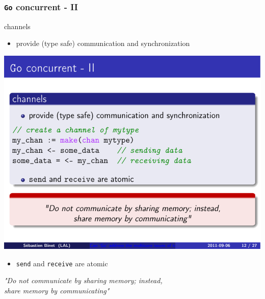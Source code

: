 \documentclass[9pt]{beamer}
\begin{document}
\begin{frame}[fragile]
\frametitle{\verb~Go~ concurrent - II}
\begin{block}{channels}


\begin{itemize}
\item provide (type safe) communication and synchronization
\end{itemize}

\begin{center}
  \includegraphics[width=.5\linewidth]{figs/go-chan.pdf}
\end{center}





\begin{itemize}
\item \verb~send~ and \verb~receive~ are atomic
\end{itemize}
\end{block}

\begin{alertblock}{\quad}

 \begin{center}
 \emph{
 "Do not communicate by sharing memory; instead, \\
  share memory by communicating"
 }
 \end{center}
\end{alertblock}
\end{frame}
\end{document}
